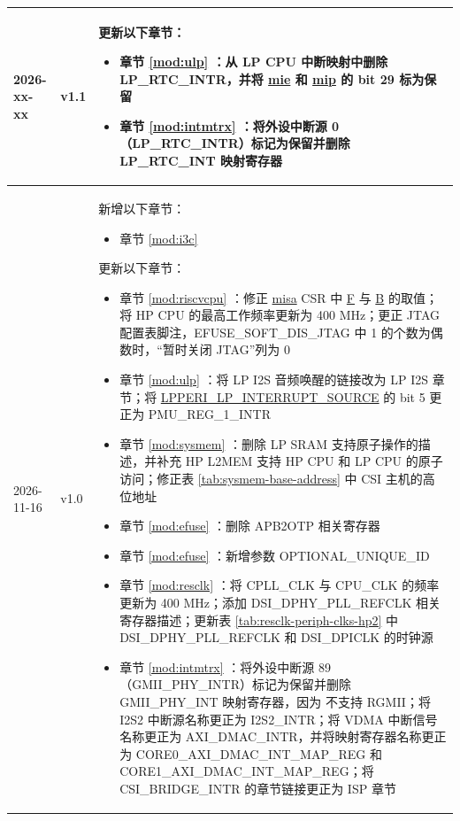 \begin{longtable}[l]{ | m{2cm} | m{1.5cm} | m{12cm} | }
    2026-xx-xx & v1.1 &
    更新以下章节：
    \begin{itemize}
        \item 章节 \ref{mod:ulp} \textit{\nameref{mod:ulp}}：从 LP CPU 中断映射中删除 LP\_RTC\_INTR，并将 \hyperref[regdesc:LPMIE]{mie} 和 \hyperref[regdesc:LPMIP]{mip} 的 bit 29 标为保留
        \item 章节 \ref{mod:intmtrx} \textit{\nameref{mod:intmtrx}}：将外设中断源 0（LP\_RTC\_INTR）标记为保留并删除 LP\_RTC\_INT 映射寄存器
    \end{itemize}
    \\\hline
    2026-11-16 & v1.0 &
    新增以下章节：
    \begin{itemize}
        \item 章节 \ref{mod:i3c} \textit{\nameref{mod:i3c}}
    \end{itemize}
    更新以下章节：
    \begin{itemize}
        \item 章节 \ref{mod:riscvcpu} \textit{\nameref{mod:riscvcpu}}：修正 \hyperref[regdesc:MISA]{misa} CSR 中 \hyperref[fielddesc:MISAF]{F} 与 \hyperref[fielddesc:MISAB]{B} 的取值；将 HP CPU 的最高工作频率更新为 400 MHz；更正 JTAG 配置表脚注，EFUSE\_SOFT\_DIS\_JTAG 中 1 的个数为偶数时，“暂时关闭 JTAG”列为 0 %
        \item 章节 \ref{mod:ulp} \textit{\nameref{mod:ulp}}：将 LP I2S 音频唤醒的链接改为 LP I2S 章节；将 \hyperref[fielddesc:LPPERILPINTERRUPTSOURCE]{LPPERI\_LP\_INTERRUPT\_SOURCE} 的 bit 5 更正为 PMU\_REG\_1\_INTR %
        \item 章节 \ref{mod:sysmem} \textit{\nameref{mod:sysmem}}：删除 LP SRAM 支持原子操作的描述，并补充 HP L2MEM 支持 HP CPU 和 LP CPU 的原子访问；修正表 \ref{tab:sysmem-base-address} \textit{\nameref{tab:sysmem-base-address}} 中 CSI 主机的高位地址 %
        \item 章节 \ref{mod:efuse} \textit{\nameref{mod:efuse}}：删除 APB2OTP 相关寄存器
        \item 章节 \ref{mod:efuse} \textit{\nameref{mod:efuse}}：新增参数 OPTIONAL\_UNIQUE\_ID %
        \item 章节 \ref{mod:resclk} \textit{\nameref{mod:resclk}}：将 CPLL\_CLK 与 CPU\_CLK 的频率更新为 400 MHz；添加 DSI\_DPHY\_PLL\_REFCLK 相关寄存器描述；更新表 \ref{tab:resclk-periph-clks-hp2} \textit{\nameref{tab:resclk-periph-clks-hp2}} 中 DSI\_DPHY\_PLL\_REFCLK 和 DSI\_DPICLK 的时钟源 %
        \item 章节 \ref{mod:intmtrx} \textit{\nameref{mod:intmtrx}}：将外设中断源 89（GMII\_PHY\_INTR）标记为保留并删除 GMII\_PHY\_INT 映射寄存器，因为 \chipname{} 不支持 RGMII；将 I2S2 中断源名称更正为 I2S2\_INTR；将 VDMA 中断信号名称更正为 AXI\_DMAC\_INTR，并将映射寄存器名称更正为 CORE0\_AXI\_DMAC\_INT\_MAP\_REG 和 CORE1\_AXI\_DMAC\_INT\_MAP\_REG；将 CSI\_BRIDGE\_INTR 的章节链接更正为 ISP 章节

\end{itemize}
\end{longtable}
